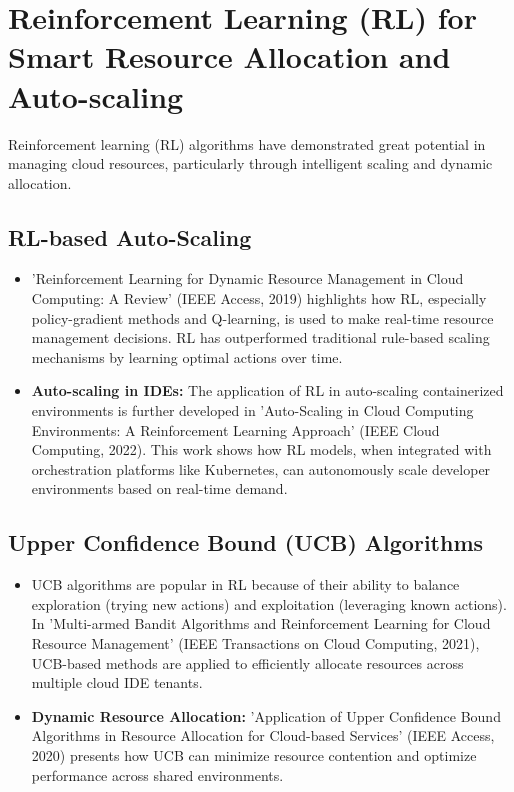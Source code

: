 \documentclass[12pt,a4paper,final]{report}
\begin{document}
\section{Reinforcement Learning (RL) for Smart Resource Allocation and Auto-scaling}

Reinforcement learning (RL) algorithms have demonstrated great potential in managing cloud resources, particularly through intelligent scaling and dynamic allocation.

\subsection{RL-based Auto-Scaling}
\begin{itemize}
    \item 'Reinforcement Learning for Dynamic Resource Management in Cloud Computing: A Review' (IEEE Access, 2019) highlights how RL, especially policy-gradient methods and Q-learning, is used to make real-time resource management decisions. RL has outperformed traditional rule-based scaling mechanisms by learning optimal actions over time.
    \item \textbf{Auto-scaling in IDEs:} The application of RL in auto-scaling containerized environments is further developed in 'Auto-Scaling in Cloud Computing Environments: A Reinforcement Learning Approach' (IEEE Cloud Computing, 2022). This work shows how RL models, when integrated with orchestration platforms like Kubernetes, can autonomously scale developer environments based on real-time demand.
\end{itemize}

\subsection{Upper Confidence Bound (UCB) Algorithms}
\begin{itemize}
    \item UCB algorithms are popular in RL because of their ability to balance exploration (trying new actions) and exploitation (leveraging known actions). In 'Multi-armed Bandit Algorithms and Reinforcement Learning for Cloud Resource Management' (IEEE Transactions on Cloud Computing, 2021), UCB-based methods are applied to efficiently allocate resources across multiple cloud IDE tenants.
    \item \textbf{Dynamic Resource Allocation:} 'Application of Upper Confidence Bound Algorithms in Resource Allocation for Cloud-based Services' (IEEE Access, 2020) presents how UCB can minimize resource contention and optimize performance across shared environments.
\end{itemize}
\end{document}
